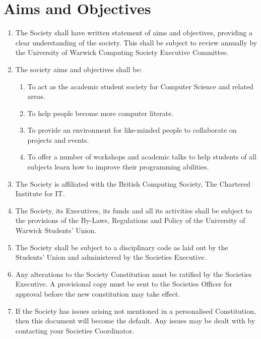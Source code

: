 \documentclass{article}
\begin{document}
\section{Aims and Objectives}
\begin{enumerate}
    \item The Society shall have written statement of aims and objectives, providing a clear understanding of the society. This shall be subject to review annually by the University of Warwick Computing Society Executive Committee.
    \item The society aims and objectives shall be:
    \begin{enumerate}
        \item To act as the academic student society for Computer Science and related areas.
        \item To help people become more computer literate.
        \item To provide an environment for like-minded people to collaborate on projects and events.
        \item To offer a number of workshops and academic talks to help students of all subjects learn how to improve their programming abilities.
    \end{enumerate}
    \item The Society is affiliated with the British Computing Society, The Chartered Institute for IT.
    \item The Society, its Executives, its funds and all its activities shall be subject to the provisions of the By-Laws, Regulations and Policy of the University of Warwick Students’ Union.
    \item The Society shall be subject to a disciplinary code as laid out by the Students’ Union and administered by the Societies Executive.
    \item Any alterations to the Society Constitution must be ratified by the Societies Executive. A provisional copy must be sent to the Societies Officer for approval before the new constitution may take effect.
    \item If the Society has issues arising not mentioned in a personalised Constitution, then this document will become the default. Any issues may be dealt with by contacting your Societies Coordinator.
\end{enumerate}
\end{document}
